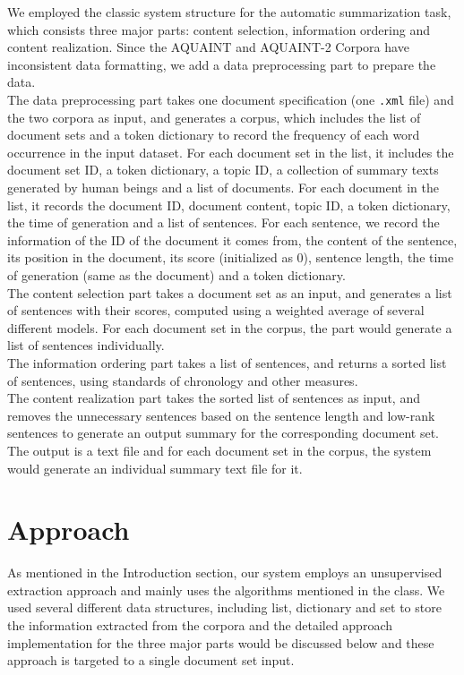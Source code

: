 \documentclass[11pt]{article}
\begin{document}
We employed the classic system structure for the automatic summarization task, which consists three major parts: content selection, information ordering and content realization. Since the AQUAINT and AQUAINT-2 Corpora have inconsistent data formatting, we add a data preprocessing part to prepare the data.  \\
\indent
The data preprocessing part takes one document specification (one \texttt{.xml} file) and the two corpora as input, and generates a corpus, which includes the list of document sets and a token dictionary to record the frequency of each word occurrence in the input dataset. For each document set in the list, it includes the document set ID, a token dictionary, a topic ID, a collection of summary texts generated by human beings and a list of documents. For each document in the list, it records the document ID, document content, topic ID, a token dictionary, the time of generation and a list of sentences. For each sentence, we record the information of the ID of the document it comes from, the content of the sentence, its position in the document, its score (initialized as 0), sentence length, the time of generation (same as the document) and a token dictionary.\\
\indent
The content selection part takes a document set as an input, and generates a list of sentences with their scores, computed using a weighted average of several different models. For each document set in the corpus, the part would generate a list of sentences individually.\\
\indent
The information ordering part takes a list of sentences, and returns a sorted list of sentences, using standards of chronology and other measures. \\
\indent
The content realization part takes the sorted list of sentences as input, and removes the unnecessary sentences based on the sentence length and low-rank sentences to generate an output summary for the corresponding document set. The output is a text file and for each document set in the corpus, the system would generate an individual summary text file for it.

\section{Approach}

As mentioned in the Introduction section, our system employs an unsupervised extraction approach and mainly uses the algorithms mentioned in the class. We used several different data structures, including list, dictionary and set to store the information extracted from the corpora and the detailed approach implementation for the three major parts would be discussed below and these approach is targeted to a single document set input.
\end{document}

